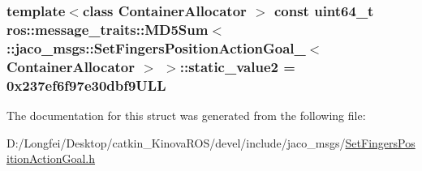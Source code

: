 \subsubsection[{\texorpdfstring{static\+\_\+value2}{static_value2}}]{\setlength{\rightskip}{0pt plus 5cm}template$<$class Container\+Allocator $>$ const uint64\+\_\+t ros\+::message\+\_\+traits\+::\+M\+D5\+Sum$<$ \+::{\bf jaco\+\_\+msgs\+::\+Set\+Fingers\+Position\+Action\+Goal\+\_\+}$<$ Container\+Allocator $>$ $>$\+::static\+\_\+value2 = 0x237ef6f97e30dbf9\+U\+LL\hspace{0.3cm}{\ttfamily [static]}}\hypertarget{structros_1_1message__traits_1_1MD5Sum_3_01_1_1jaco__msgs_1_1SetFingersPositionActionGoal___3_01ContainerAllocator_01_4_01_4_a9a1d9cd76b6b8356c10bc078d38191bd}{}\label{structros_1_1message__traits_1_1MD5Sum_3_01_1_1jaco__msgs_1_1SetFingersPositionActionGoal___3_01ContainerAllocator_01_4_01_4_a9a1d9cd76b6b8356c10bc078d38191bd}


The documentation for this struct was generated from the following file\+:\begin{DoxyCompactItemize}
\item 
D\+:/\+Longfei/\+Desktop/catkin\+\_\+\+Kinova\+R\+O\+S/devel/include/jaco\+\_\+msgs/\hyperlink{SetFingersPositionActionGoal_8h}{Set\+Fingers\+Position\+Action\+Goal.\+h}\end{DoxyCompactItemize}
